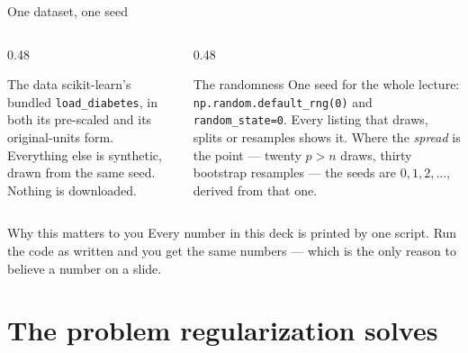 \documentclass[aspectratio=169]{beamer}
\begin{document}
\begin{frame}{One dataset, one seed}
  \begin{columns}[T]
    \begin{column}{0.48\textwidth}
      \begin{block}{The data}
        \small scikit-learn's bundled \texttt{load\_diabetes}, in both its
        pre-scaled and its original-units form. Everything else is synthetic,
        drawn from the same seed. Nothing is downloaded.
      \end{block}
    \end{column}
    \begin{column}{0.48\textwidth}
      \begin{block}{The randomness}
        \small One seed for the whole lecture:
        \texttt{np.random.default\_rng(0)} and \texttt{random\_state=0}.
        Every listing that draws, splits or resamples shows it. Where the
        \emph{spread} is the point --- twenty $p>n$ draws, thirty bootstrap
        resamples --- the seeds are $0, 1, 2, \dots$, derived from that one.
      \end{block}
    \end{column}
  \end{columns}
  \vspace{0.5em}
  \begin{exampleblock}{Why this matters to you}
    \centering\small
    Every number in this deck is printed by one script. Run the code as
    written and you get the same numbers --- which is the only reason to
    believe a number on a slide.
  \end{exampleblock}
\end{frame}

\section[Why]{The problem regularization solves}
\label{sec:why}
\end{document}
